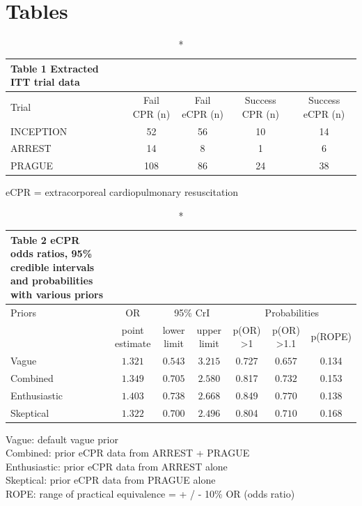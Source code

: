 \documentclass[
  super,
  preprint,
  3p]{elsarticle}
\begin{document}
\newpage

\hypertarget{tables}{%
\section{Tables}\label{tables}}

\setlength{\LTpost}{0mm}
\begin{longtable}{lcccc}
\caption*{
{\large Table 1 Extracted ITT trial data}
} \\ 
\toprule
Trial & Fail CPR (n) & Fail eCPR (n) & Success CPR (n) & Success eCPR (n) \\ 
\midrule
INCEPTION & 52 & 56 & 10 & 14 \\ 
ARREST & 14 & 8 & 1 & 6 \\ 
PRAGUE & 108 & 86 & 24 & 38 \\ 
\bottomrule
\end{longtable}
\begin{minipage}{\linewidth}
eCPR = extracorporeal cardiopulmonary resuscitation\\
\end{minipage}

\setlength{\LTpost}{0mm}
\begin{longtable}{lcccccc}
\caption*{
{\large Table 2 eCPR odds ratios, 95\% credible intervals and probabilities with various priors}
} \\ 
\toprule
Priors & OR & \multicolumn{2}{c}{95\% CrI} & \multicolumn{3}{c}{Probabilities} \\ 
\cmidrule(lr){1-1} \cmidrule(lr){2-2} \cmidrule(lr){3-4} \cmidrule(lr){5-7}
 & point estimate & lower limit & upper limit & p(OR) >1  & p(OR) >1.1  &  p(ROPE) \\ 
\midrule
Vague & $1.321$ & $0.543$ & $3.215$ & 0.727 & $0.657$ & 0.134 \\ 
Combined & $1.349$ & $0.705$ & $2.580$ & 0.817 & $0.732$ & 0.153 \\ 
Enthusiastic & $1.403$ & $0.738$ & $2.668$ & 0.849 & $0.770$ & 0.138 \\ 
Skeptical & $1.322$ & $0.700$ & $2.496$ & 0.804 & $0.710$ & 0.168 \\ 
\bottomrule
\end{longtable}
\begin{minipage}{\linewidth}
Vague: default vague prior\\
Combined: prior eCPR data from ARREST + PRAGUE\\
Enthusiastic: prior eCPR data from ARREST alone\\
Skeptical: prior eCPR data from PRAGUE alone\\
ROPE: range of practical equivalence = + / - 10\% OR (odds ratio)\\
\end{minipage}
\end{document}
